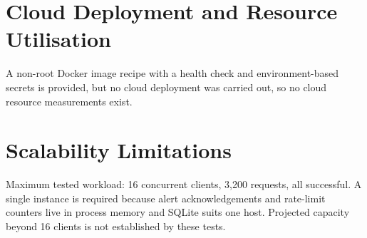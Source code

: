 \section{Cloud Deployment and Resource Utilisation}
A non-root Docker image recipe with a health check and environment-based secrets is provided, but no
cloud deployment was carried out, so no cloud resource measurements exist.

\section{Scalability Limitations}
Maximum tested workload: 16 concurrent clients, 3{,}200 requests, all successful. A single instance is
required because alert acknowledgements and rate-limit counters live in process memory and SQLite suits
one host. Projected capacity beyond 16 clients is not established by these tests.
